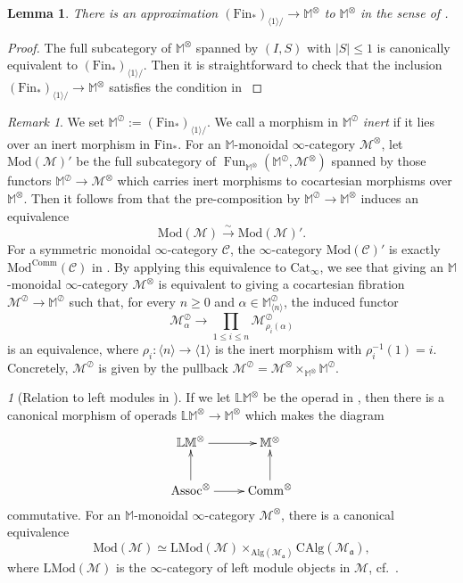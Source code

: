 \documentclass{amsart}
\theoremstyle{plain}
\newtheorem{lemma}[theorem]{Lemma}
\theoremstyle{definition}
\theoremstyle{remark}
\newtheorem{remark}[theorem]{Remark}
\newtheorem{p}[theorem]{}
\numberwithin{equation}{theorem}
\newcommand{\mcal}[1]{\mathcal{#1}}
\newcommand{\mbb}[1]{\mathbb{#1}}
\newcommand{\mfk}[1]{\mathfrak{#1}}
\newcommand{\Alg}{\mathrm{Alg}}
\newcommand{\Assoc}{\mathrm{Assoc}}
\newcommand{\CAlg}{\mathrm{CAlg}}
\newcommand{\Cat}{\mathrm{Cat}}
\newcommand{\Comm}{\mathrm{Comm}}
\newcommand{\Fin}{\mathrm{Fin}}
\newcommand{\LMod}{\mathrm{LMod}}
\newcommand{\Mod}{\mathrm{Mod}}
\newcommand{\Fun}{\operatorname{Fun}}
\begin{document}
\begin{lemma}\label{lem:Mod2}
There is an approximation $(\Fin_*)_{\langle 1\rangle/}\to\mbb{M}^\otimes$ to $\mbb{M}^\otimes$ in the sense of \cite[2.3.3.6]{HA}.
\end{lemma}
\begin{proof}
The full subcategory of $\mbb{M}^\otimes$ spanned by $(I,S)$ with $|S|\le 1$ is canonically equivalent to $(\Fin_*)_{\langle 1\rangle/}$.
Then it is straightforward to check that the inclusion $(\Fin_*)_{\langle 1\rangle/}\to\mbb{M}^\otimes$ satisfies the condition in \cite[2.3.3.6]{HA}
\end{proof}

\begin{remark}
We set $\mbb{M}^\oslash:=(\Fin_*)_{\langle 1\rangle/}$.
We call a morphism in $\mbb{M}^\oslash$ \textit{inert} if it lies over an inert morphism in $\Fin_*$.
For an $\mbb{M}$-monoidal $\infty$-category $\mcal{M}^\otimes$, let $\Mod(\mcal{M})'$ be the full subcategory of $\Fun_{\mbb{M}^\otimes}(\mbb{M}^\oslash,\mcal{M}^\otimes)$ spanned by those functors $\mbb{M}^\oslash\to\mcal{M}^\otimes$ which carries inert morphisms to cocartesian morphisms over $\mbb{M}^\otimes$.
Then it follows from \cite[2.3.3.23]{HA} that the pre-composition by $\mbb{M}^\oslash\to\mbb{M}^\otimes$ induces an equivalence
\[
	\Mod(\mcal{M}) \xrightarrow{\sim} \Mod(\mcal{M})'.
\]
For a symmetric monoidal $\infty$-category $\mcal{C}$, the $\infty$-category $\Mod(\mcal{C})'$ is exactly $\Mod^\Comm(\mcal{C})$ in \cite[3.3.3.8]{HA}.
By applying this equivalence to $\Cat_\infty$, we see that giving an $\mbb{M}$-monoidal $\infty$-category $\mcal{M}^\otimes$ is equivalent to giving a cocartesian fibration $\mcal{M}^\oslash\to\mbb{M}^\oslash$ such that, for every $n\ge 0$ and $\alpha\in\mbb{M}^\oslash_{\langle n\rangle}$, the induced functor
\[
	\mcal{M}^\oslash_\alpha \to \prod_{1\le i\le n}\mcal{M}^\oslash_{\rho_i(\alpha)}
\]
is an equivalence, where $\rho_i\colon\langle n\rangle\to\langle 1\rangle$ is the inert morphism with $\rho_i^{-1}(1)=i$.
Concretely, $\mcal{M}^\oslash$ is given by the pullback $\mcal{M}^\oslash=\mcal{M}^\otimes\times_{\mbb{M}^\otimes}\mbb{M}^\oslash$.
\end{remark}

\begin{p}[Relation to left modules in \cite{HA}]
If we let $\mbb{LM}^\otimes$ be the operad in \cite[4.2.1.7]{HA}, then there is a canonical morphism of operads $\mbb{LM}^\otimes\to\mbb{M}^\otimes$ which makes the diagram 
\[
\xymatrix{
	\mbb{LM}^\otimes \ar[r] & \mbb{M}^\otimes \\
	\Assoc^\otimes \ar[u] \ar[r] & \Comm^\otimes \ar[u]
}
\]
commutative.
For an $\mbb{M}$-monoidal $\infty$-category $\mcal{M}^\otimes$, there is a canonical equivalence
\[
	\Mod(\mcal{M}) \simeq \LMod(\mcal{M})\times_{\Alg(\mcal{M}_\mfk{a})}\CAlg(\mcal{M}_\mfk{a}),
\]
where $\LMod(\mcal{M})$ is the $\infty$-category of left module objects in $\mcal{M}$, cf.\ \cite[4.2.1.13]{HA}.
\end{p}
\end{document}

